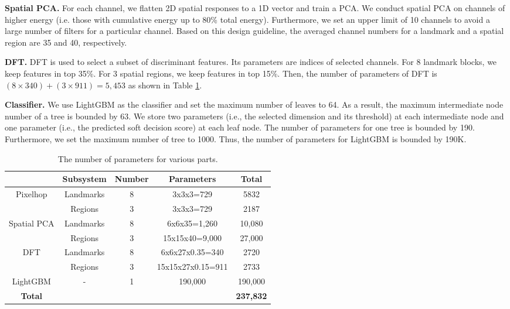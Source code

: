 \documentclass[main, biber]{now-journal}
\begin{document}
{\bf Spatial PCA.} For each channel, we flatten 2D spatial responses to
a 1D vector and train a PCA. We conduct spatial PCA on channels of
higher energy (i.e. those with cumulative energy up to 80\% total
energy).  Furthermore, we set an upper limit of 10 channels to avoid a
large number of filters for a particular channel. Based on this design
guideline, the averaged channel numbers for a landmark and a spatial
region are 35 and 40, respectively. 

{\bf DFT.} DFT is used to select a subset of discriminant features. Its
parameters are indices of selected channels. For 8 landmark blocks, we
keep features in top 35\%. For 3 spatial regions, we keep features in
top 15\%. Then, the number of parameters of DFT is $(8 \times 340)+ (3
\times 911) = 5,453$ as shown in Table \ref{tab:parameters}. 

{\bf Classifier.} We use LightGBM \citep{ke2017lightgbm} as the
classifier and set the maximum number of leaves to 64. As a result, the
maximum intermediate node number of a tree is bounded by 63.  We store
two parameters (i.e., the selected dimension and its threshold) at each
intermediate node and one parameter (i.e., the predicted soft decision
score) at each leaf node. The number of parameters for one tree is
bounded by 190. Furthermore, we set the maximum number of tree to 1000.
Thus, the number of parameters for LightGBM is bounded by 190K. 

\begin{table}[ht]
\vspace{-0.3cm}
\caption{The number of parameters for various parts.}\label{tab:parameters}
\begin{center}
\vspace{0.1cm}
\begin{tabular}{c|c|c|c|c} \hline \hline
  & Subsystem & Number & Parameters & Total\\ \hline
\multirow{2}{*}{Pixelhop} & Landmarks   & 8 & 3x3x3=729 & 5832\\ 
                          & Regions     & 3 & 3x3x3=729 & 2187\\ \hline
\multirow{2}{*}{Spatial PCA} & Landmarks  & 8 & 6x6x35=1,260 & 10,080 \\ 
                             & Regions    & 3 & 15x15x40=9,000 & 27,000 \\ \hline
\multirow{2}{*}{DFT}      & Landmarks   & 8 & 6x6x27x0.35=340 & 2720\\ 
                          & Regions     & 3 & 15x15x27x0.15=911 & 2733\\ \hline
\multirow{1}{*}{LightGBM} & - & 1 & 190,000 & 190,000\\ \hline
\textbf{Total} & & & &\textbf{237,832}\\ \hline
\end{tabular}
\end{center}
\vspace{-0.2cm}
\end{table}
\end{document}
